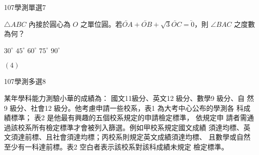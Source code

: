 \begin{QUESTIONS}
\begin{QUESTION}
\begin{QEMPTYSPACE}
        \end{QEMPTYSPACE}
    \end{QUESTION}
    \begin{QUESTION}
        \begin{ExamInfo}{107}{學測}{單選}{7}
        \end{ExamInfo}
        \begin{ExamAnsRateInfo}{}{}{}{}
        \end{ExamAnsRateInfo}
        \begin{QBODY}
            $\triangle ABC$ 內接於圓心為 $O$ 之單位圓。若$\lvec{OA} +\lvec{OB}+\sqrt{3}\lvec{OC} = \lvec{0}$，則 $\angle BAC$ 之度數為何？
            \begin{QOPS}
                \QOP $30^\circ$
                \QOP $45^\circ$
                \QOP $60^\circ$ 
                \QOP $75^\circ$
                \QOP $90^\circ$
            \end{QOPS}
        \end{QBODY}
        \begin{QFROMS}
        \end{QFROMS}
        \begin{QTAGS}\end{QTAGS}
        \begin{QANS}
            $(4)$
        \end{QANS}
        \begin{QSOLLIST}
        \end{QSOLLIST}
        \begin{QEMPTYSPACE}
        \end{QEMPTYSPACE}
    \end{QUESTION}
\end{QUESTIONS}\begin{QUESTIONS}
    \begin{QUESTION}
        \begin{ExamInfo}{107}{學測}{多選}{8}
        \end{ExamInfo}
        \begin{ExamAnsRateInfo}{}{}{}{}
        \end{ExamAnsRateInfo}
        \begin{QBODY}
            某年學科能力測驗小華的成績為： 國文11級分、英文12 級分、數學9 級分、自
            然9 級分、社會12 級分。他考慮申請一些校系，表1 為大考中心公布的學測各
            科成績標準； 表2 是他最有興趣的五個校系規定的申請檢定標準， 依規定申
            請者需通過該校系所有檢定標準才會被列入篩選。例如甲校系規定國文成績
            須達均標、英文須達前標、且社會須達均標；丙校系則規定英文成績須達均標、
            且數學或自然至少有一科達前標。表2 空白者表示該校系對該科成績未規定
            檢定標準。
            

\end{QBODY}
\end{QUESTION}
\end{QUESTIONS}

